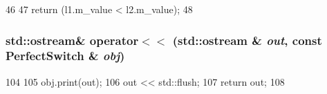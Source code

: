 \begin{DoxyCode}
46 {
47     return (l1.m_value < l2.m_value);
48 }
\end{DoxyCode}
\hypertarget{PerfectSwitch_8hh_a4a6940d170ff9169a1516b65924daf2f}{
\subsubsection[{operator$<$$<$}]{\setlength{\rightskip}{0pt plus 5cm}std::ostream\& operator$<$$<$ (std::ostream \& {\em out}, \/  const {\bf PerfectSwitch} \& {\em obj})}}
\label{PerfectSwitch_8hh_a4a6940d170ff9169a1516b65924daf2f}



\begin{DoxyCode}
104 {
105     obj.print(out);
106     out << std::flush;
107     return out;
108 }
\end{DoxyCode}
